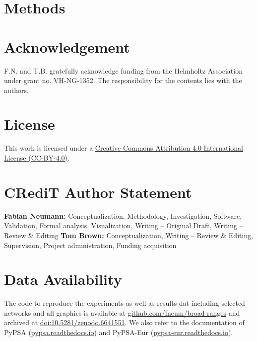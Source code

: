 \documentclass[1p,11pt]{elsarticle}
\newcommand{\usection}[2]{
	\section*{#1}
	\label{#2}
	\addcontentsline{toc}{section}{\nameref{#2}}
}
\begin{document}
\usection{Methods}{sec:methods}



\section*{Acknowledgement}

F.N. and T.B. gratefully acknowledge funding from the Helmholtz Association
under grant no. VH-NG-1352. The responsibility for the contents lies with the
authors.

\section*{License}

This work is licensed under a \href{http://creativecommons.org/licenses/by/4.0/}{Creative Commons Attribution 4.0
International License (CC-BY-4.0)}.

\section*{CRediT Author Statement}

\textbf{Fabian Neumann:} Conceptualization, Methodology, Investigation, Software, Validation, Formal analysis, Visualization, Writing -- Original Draft, Writing -- Review \& Editing
\textbf{Tom Brown:} Conceptualization, Writing -- Review \& Editing, Supervision, Project administration, Funding acquisition

\section*{Data Availability}

The code to reproduce the experiments as well as results dat including selected
networks and all graphics is available at
\href{https://github.com/fneum/broad-ranges}{github.com/fneum/broad-ranges} and
archived at
\href{https://doi.org/10.5281/zenodo.6641551}{doi:10.5281/zenodo.6641551}. We
also refer to the documentation of PyPSA
(\href{https://pypsa.readthedocs.io}{pypsa.readthedocs.io}) and PyPSA-Eur
(\href{https://pypsa-eur.readthedocs.io}{pypsa-eur.readthedocs.io}).

\renewcommand{\ttdefault}{\sfdefault}


\newpage
\tableofcontents

% 	
\end{document}

